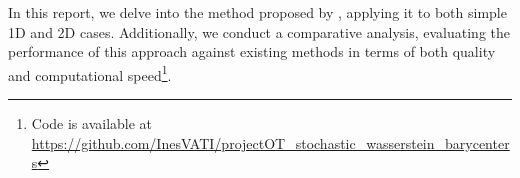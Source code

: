In this report, we delve into the method proposed by \cite{claici_stochastic_2018}, applying it to both simple 1D and 2D cases. Additionally, we conduct a comparative analysis, evaluating the performance of this approach against existing methods in terms of both quality and computational speed\footnote{Code is available at \url{https://github.com/InesVATI/projectOT_stochastic_wasserstein_barycenters}}. 